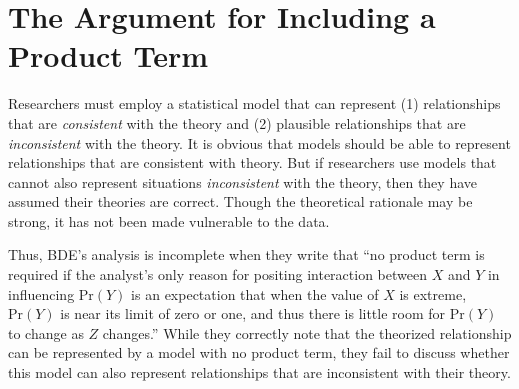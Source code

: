 \documentclass[12pt]{article}
\begin{document}
\section*{The Argument for Including a Product Term}

Researchers must employ a statistical model that can represent (1) relationships that are \emph{consistent} with the theory and (2) plausible relationships that are \emph{inconsistent} with the theory. It is obvious that models should be able to represent relationships that are consistent with theory. But if researchers use models that cannot also represent situations \emph{inconsistent} with the theory, then they have assumed their theories are correct. Though the theoretical rationale may be strong, it has not been made vulnerable to the data.

Thus, BDE's analysis is incomplete when they write that ``no product term is required if the analyst's only reason for positing interaction between $X$ and $Y$ in influencing $\text{Pr}(Y)$ is an expectation that when the value of $X$ is extreme, $\text{Pr}(Y)$ is near its limit of zero or one, and thus there is little room for $\text{Pr}(Y)$ to change as $Z$ changes.'' While they correctly note that the theorized relationship can be represented by a model with no product term, they fail to discuss whether this model can also represent relationships that are inconsistent with their theory.
\end{document}

